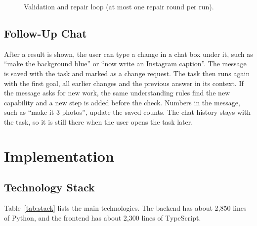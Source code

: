 \documentclass[conference]{IEEEtran}
\begin{document}
\begin{figure}[!t]
\centering
{}
\caption{Validation and repair loop (at most one repair round per run).}
\label{fig:repair}
\end{figure}

\subsection{Follow-Up Chat}
After a result is shown, the user can type a change in a chat box under it, such as ``make the background
blue'' or ``now write an Instagram caption''. The message is saved with the task and marked as a change
request. The task then runs again with the first goal, all earlier changes and the previous answer in its
context. If the message asks for new work, the same understanding rules find the new capability and a
new step is added before the check. Numbers in the message, such as ``make it 3 photos'', update the
saved counts. The chat history stays with the task, so it is still there when the user opens the task
later.

\section{Implementation}

\subsection{Technology Stack}
Table~\ref{tab:stack} lists the main technologies. The backend has about 2,850 lines of Python, and the
frontend has about 2,300 lines of TypeScript.
\end{document}
